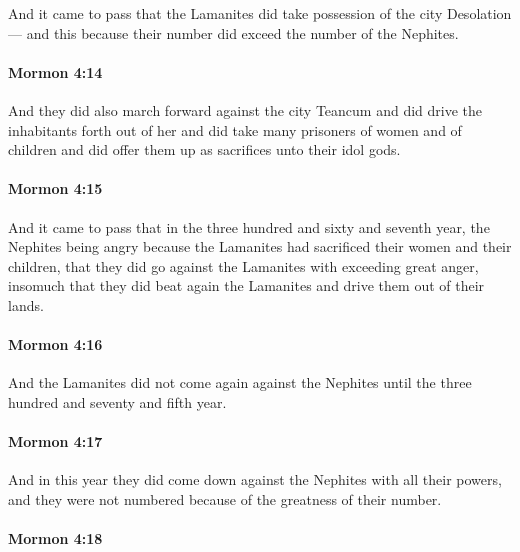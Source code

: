 			And it came to pass that
			the Lamanites did take possession of the city Desolation---
			and this because their number did exceed the number of the Nephites.

		\paragraph{Mormon 4:14} %
			\label{MORMON-4-14}

			And they did also march forward against the city Teancum
			and did drive the inhabitants forth out of her
			and did take many prisoners of women and of children
			and did offer them up as sacrifices unto their idol gods.

		\paragraph{Mormon 4:15} %
			\label{MORMON-4-15}

			And it came to pass that in the three hundred and sixty and seventh year,
			the Nephites being angry
			because the Lamanites had sacrificed their women and their children,
			that they did go against the Lamanites with exceeding great anger,
			insomuch that they did beat again the Lamanites
			and drive them out of their lands.

		\paragraph{Mormon 4:16} %
			\label{MORMON-4-16}

			And the Lamanites did not come again against the Nephites
			until the three hundred and seventy and fifth year.

		\paragraph{Mormon 4:17} %
			\label{MORMON-4-17}

			And in this year they did come down against the Nephites with all their powers,
			and they were not numbered because of the greatness of their number.

		\paragraph{Mormon 4:18} %
			\label{MORMON-4-18}

